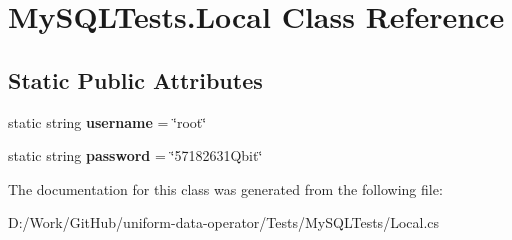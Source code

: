 \hypertarget{class_my_s_q_l_tests_1_1_local}{}\section{My\+S\+Q\+L\+Tests.\+Local Class Reference}
\label{class_my_s_q_l_tests_1_1_local}
\subsection*{Static Public Attributes}
\begin{DoxyCompactItemize}
\item 
\mbox{\label{class_my_s_q_l_tests_1_1_local_a19d9d8d0e3af59a0856bba6184a464eb}} 
static string {\bfseries username} = \char`\"{}root\char`\"{}
\item 
\mbox{\label{class_my_s_q_l_tests_1_1_local_ad4430d5a115b43817b9776f2ccbf5633}} 
static string {\bfseries password} = \char`\"{}57182631\+Qbit\char`\"{}
\end{DoxyCompactItemize}


The documentation for this class was generated from the following file\+:\begin{DoxyCompactItemize}
\item 
D\+:/\+Work/\+Git\+Hub/uniform-\/data-\/operator/\+Tests/\+My\+S\+Q\+L\+Tests/Local.\+cs\end{DoxyCompactItemize}
